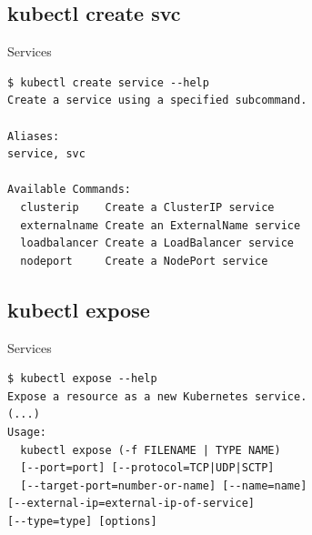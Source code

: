 \documentclass{beamer}
\begin{document}
\subsection{kubectl create svc}

\begin{frame}[fragile]{Services}
    
\begin{lstlisting}
$ kubectl create service --help
Create a service using a specified subcommand.

Aliases:
service, svc

Available Commands:
  clusterip    Create a ClusterIP service
  externalname Create an ExternalName service
  loadbalancer Create a LoadBalancer service
  nodeport     Create a NodePort service
\end{lstlisting}    
    
    
\end{frame}

\subsection{kubectl expose}

\begin{frame}[fragile]{Services}
    
\begin{lstlisting}
$ kubectl expose --help
Expose a resource as a new Kubernetes service.
(...)
Usage:
  kubectl expose (-f FILENAME | TYPE NAME) 
  [--port=port] [--protocol=TCP|UDP|SCTP] 
  [--target-port=number-or-name] [--name=name]
[--external-ip=external-ip-of-service] 
[--type=type] [options]
\end{lstlisting}    
    
    
\end{frame}
\end{document}
